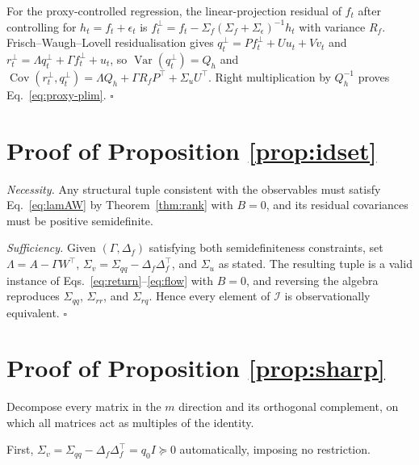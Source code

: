 \documentclass[10pt,twocolumn]{article}
\theoremstyle{remark}
\newcommand{\Var}{\operatorname{Var}}
\newcommand{\Cov}{\operatorname{Cov}}
\begin{document}
For the proxy-controlled regression, the linear-projection residual of $f_t$
after controlling for $h_t=f_t+\epsilon_t$ is
$f_t^\perp=f_t-\Sigma_f(\Sigma_f+\Sigma_\epsilon)^{-1}h_t$ with variance
$R_f$. Frisch--Waugh--Lovell residualisation gives
$q_t^\perp=Pf_t^\perp+Uu_t+Vv_t$ and
$r_t^\perp=\Lambda q_t^\perp+\Gamma f_t^\perp+u_t$, so $\Var(q_t^\perp)=Q_h$
and $\Cov(r_t^\perp,q_t^\perp)=\Lambda Q_h+\Gamma R_fP^\top+\Sigma_uU^\top$.
Right multiplication by $Q_h^{-1}$ proves Eq.~\eqref{eq:proxy-plim}.
\hfill$\square$

\section{Proof of Proposition \ref{prop:idset}}
\label{app:idset}

\emph{Necessity.} Any structural tuple consistent with the observables must
satisfy Eq.~\eqref{eq:lamAW} by Theorem~\ref{thm:rank} with $B=0$, and its
residual covariances must be positive semidefinite.

\emph{Sufficiency.} Given $(\Gamma,\Delta_f)$ satisfying both semidefiniteness
constraints, set $\Lambda=A-\Gamma W^\top$, $\Sigma_v=\Sigma_{qq}-\Delta_f
\Delta_f^\top$, and $\Sigma_u$ as stated. The resulting tuple is a valid
instance of Eqs.~\eqref{eq:return}--\eqref{eq:flow} with $B=0$, and reversing
the algebra reproduces $\Sigma_{qq}$, $\Sigma_{rr}$, and $\Sigma_{rq}$.
Hence every element of $\mathcal I$ is observationally equivalent.
\hfill$\square$

\section{Proof of Proposition \ref{prop:sharp}}
\label{app:sharp}

Decompose every matrix in the $m$ direction and its orthogonal complement, on
which all matrices act as multiples of the identity.

First, $\Sigma_v=\Sigma_{qq}-\Delta_f\Delta_f^\top=q_0I\succeq0$
automatically, imposing no restriction.
\end{document}
